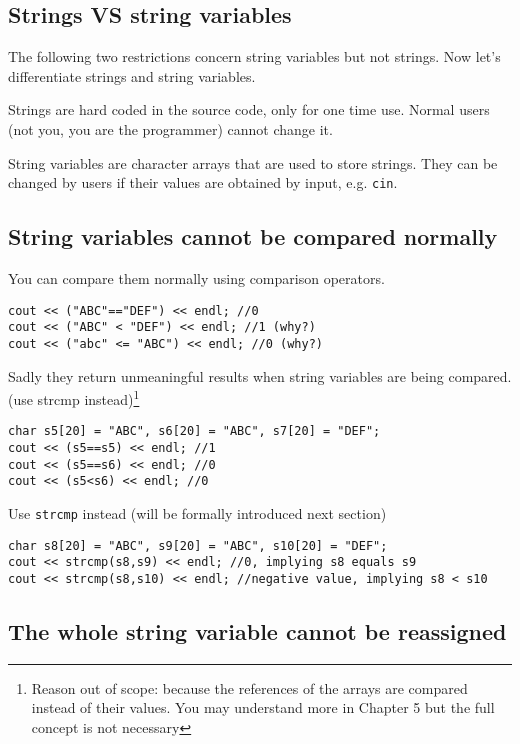 \subsection{Strings VS string variables}

The following two restrictions concern string variables but not strings. Now let's differentiate strings and string variables.


Strings are hard coded in the source code, only for one time use. Normal users (not you, you are the programmer) cannot change it.

String variables are character arrays that are used to store strings. They can be changed by users if their values are obtained by input, e.g. \texttt{cin}. 

\subsection*{String variables cannot be compared normally}

You can compare them normally using comparison operators.

\begin{lstlisting}
cout << ("ABC"=="DEF") << endl; //0
cout << ("ABC" < "DEF") << endl; //1 (why?)
cout << ("abc" <= "ABC") << endl; //0 (why?)
\end{lstlisting}

Sadly they return unmeaningful results when string variables are being compared. (use strcmp instead)\footnote{Reason out of scope: because the references of the arrays are compared instead of their values. You may understand more in Chapter 5 but the full concept is not necessary}

\begin{lstlisting}
char s5[20] = "ABC", s6[20] = "ABC", s7[20] = "DEF";
cout << (s5==s5) << endl; //1
cout << (s5==s6) << endl; //0
cout << (s5<s6) << endl; //0
\end{lstlisting}

Use \texttt{strcmp} instead (will be formally introduced next section)
\begin{lstlisting}
char s8[20] = "ABC", s9[20] = "ABC", s10[20] = "DEF";
cout << strcmp(s8,s9) << endl; //0, implying s8 equals s9
cout << strcmp(s8,s10) << endl; //negative value, implying s8 < s10
\end{lstlisting}

\subsection*{The whole string variable cannot be reassigned}

